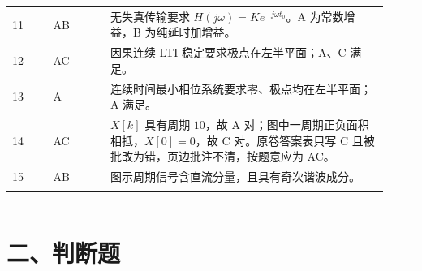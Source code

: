\documentclass[11pt]{ctexart}
\begin{document}
\begin{center}
\begin{longtable}{p{0.10\linewidth} p{0.14\linewidth} p{0.68\linewidth}}
\addlinespace[1pt]

11 & AB & 无失真传输要求 \(H(j\omega)=Ke^{-j\omega t_0}\)。A 为常数增益，B 为纯延时加增益。 \\

\addlinespace[1pt]

12 & AC & 因果连续 LTI 稳定要求极点在左半平面；A、C 满足。 \\

\addlinespace[1pt]

13 & A & 连续时间最小相位系统要求零、极点均在左半平面；A 满足。 \\

\addlinespace[1pt]

14 & AC & \(X[k]\) 具有周期 \(10\)，故 A 对；图中一周期正负面积相抵，\(X[0]=0\)，故 C 对。原卷答案表只写 C 且被批改为错，页边批注不清，按题意应为 AC。 \\

\addlinespace[1pt]

15 & AB & 图示周期信号含直流分量，且具有奇次谐波成分。 \\

\addlinespace[1pt]

\bottomrule

\end{longtable}

\normalsize

\end{center}





\medskip\hrule\medskip



\section*{二、判断题}
\end{document}
